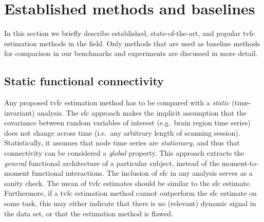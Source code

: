 \clearpage
\section{Established methods and baselines}\label{sec:established-methods}

In this section we briefly describe established, state-of-the-art, and popular \gls{tvfc} estimation methods in the field.
Only methods that are used as baseline methods for comparison in our benchmarks and experiments are discussed in more detail.

\subsection{Static functional connectivity}

Any proposed \gls{tvfc} estimation method has to be compared with a \emph{static} (time-invariant) analysis.
The \gls{sfc} approach makes the implicit assumption that the covariance between random variables of interest (e.g.~brain region time series) does not change across time (i.e.~any arbitrary length of scanning session).
Statistically, it assumes that node time series are \emph{stationary}, and thus that connectivity can be considered a \emph{global} property.
This approach extracts the \emph{general} functional architecture of a particular subject, instead of the moment-to-moment functional interactions.
%
The inclusion of \gls{sfc} in any analysis serves as a sanity check.
The mean of \gls{tvfc} estimates should be similar to the \gls{sfc} estimate.
Furthermore, if a \gls{tvfc} estimation method cannot outperform the \gls{sfc} estimate on some task, this may either indicate that there is no (relevant) dynamic signal in the data set, or that the estimation method is flawed.

